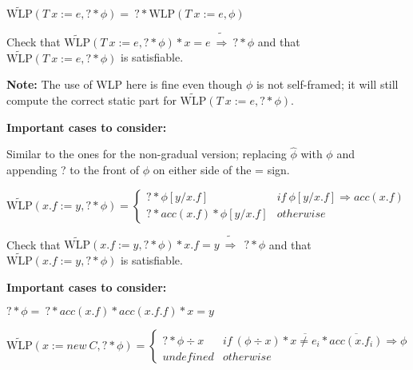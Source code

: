 \documentclass {article}
\newcommand{\eif}[3]{if \ ( #1 ) \ \{ #2 \} \ else \ \{#3\}}
\newcommand{\fphi}{\widehat{\phi}}
\newcommand{\imp}{\Rightarrow}
\newcommand{\timp}{\ \widetilde{\Rightarrow}\ }
\newcommand{\wlp}[2]{\text{WLP}(#1,#2)}
\newcommand{\twlp}[2]{\widetilde{\text{WLP}}(#1,#2)}
\begin{document}
\vspace{0.5cm}

%
%
%

$\twlp{T \ x := e}{? \ast \phi} = \ ? \ast \wlp{T \ x :=e}{\phi}$
	
Check that $\twlp{T \ x := e}{? \ast \phi} \ast x = e \timp ? \ast \phi$ and that $\twlp{T \ x := e}{? \ast \phi}$ is satisfiable.

\textbf{Note:} The use of WLP here is fine even though $\phi$ is not self-framed; it will still compute the correct static part for $\twlp{T \ x := e}{? \ast \phi}$.

\textbf{Important cases to consider:}

Similar to the ones for the non-gradual version; replacing $\fphi$ with $\phi$ and appending ? to the front of $\phi$ on either side of the = sign.

\vspace{0.5cm}

%

$\twlp{x.f := y}{? \ast \phi} =
	\begin{cases}
	 ? \ast \phi[y/x.f] & if \ \phi[y/x.f] \imp acc(x.f) \\
	 ? \ast acc(x.f) \ast \phi[y/x.f] & otherwise
	\end{cases}$

Check that $\twlp{x.f := y}{? \ast \phi} \ast x.f = y \timp \ ? \ast \phi$ and that $\twlp{x.f := y}{? \ast \phi}$ is satisfiable.

\textbf{Important cases to consider:}

$? \ast \phi = \ ? \ast acc(x.f) \ast acc(x.f.f) \ast x = y $

\vspace{0.5cm}

$\twlp{x := new\ C}{? \ast \phi} = 
	\begin{cases}
	 ? \ast \phi \div x & if \ (\phi \div x) \ast \overline{x \neq e_i} \ast \overline{acc(x.f_i)} \imp \phi \\
	 undefined & otherwise
	\end{cases}$ 
\end{document}
